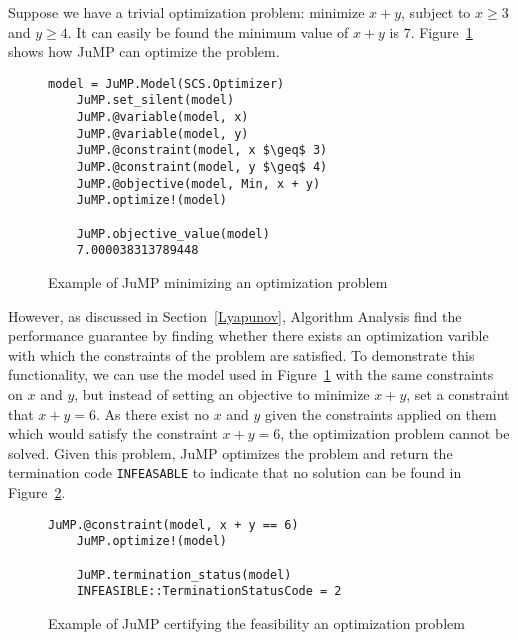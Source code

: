 Suppose we have a trivial optimization problem: minimize $x + y$, subject to $x \geq 3$ and $y \geq 4$. It can easily be found the minimum value of $x + y$ is $7$. Figure~\ref{ex_jump1} shows how JuMP can optimize the problem.
\begin{figure}[ht]
	\begin{lstlisting}[mathescape]
	model = JuMP.Model(SCS.Optimizer)
	JuMP.set_silent(model)
	JuMP.@variable(model, x)
	JuMP.@variable(model, y)
	JuMP.@constraint(model, x $\geq$ 3)
	JuMP.@constraint(model, y $\geq$ 4)
	JuMP.@objective(model, Min, x + y)
	JuMP.optimize!(model)

	JuMP.objective_value(model)
	7.000038313789448
	\end{lstlisting}
	\caption{Example of JuMP minimizing an optimization problem}
	\label{ex_jump1}
\end{figure}
However, as discussed in Section~\ref{Lyapunov}, Algorithm Analysis find the performance guarantee by finding whether there exists an optimization varible with which the constraints of the problem are satisfied. To demonstrate this functionality, we can use the model used in Figure~\ref{ex_jump1} with the same constraints on $x$ and $y$, but instead of setting an objective to minimize $x + y$, set a constraint that $x + y = 6$. As there exist no $x$ and $y$ given the constraints applied on them which would satisfy the constraint $x + y = 6$, the optimization problem cannot be solved. Given this problem, JuMP optimizes the problem and return the termination code \texttt{INFEASABLE} to indicate that no solution can be found in Figure~\ref{ex_jump2}.
\begin{figure}[ht]
	\begin{lstlisting}[mathescape]
	JuMP.@constraint(model, x + y == 6)
	JuMP.optimize!(model)
	
	JuMP.termination_status(model)
	INFEASIBLE::TerminationStatusCode = 2
	\end{lstlisting}
	\caption{Example of JuMP certifying the feasibility an optimization problem}
	\label{ex_jump2}
\end{figure}